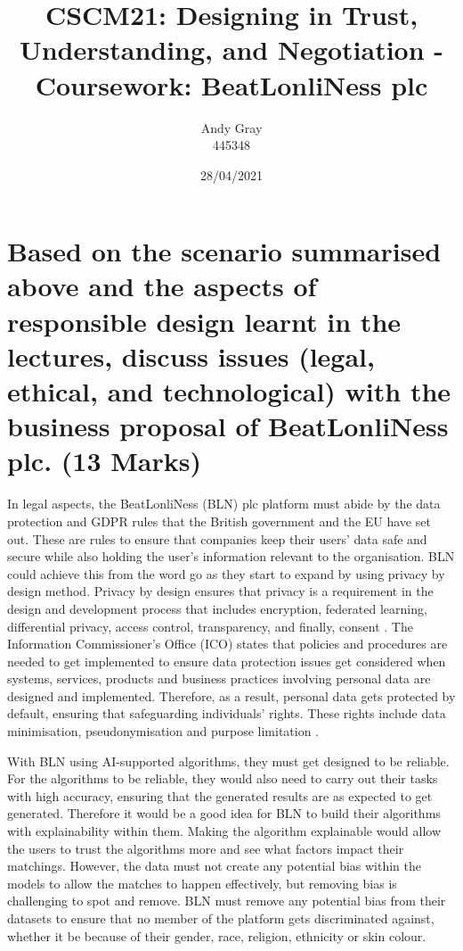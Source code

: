 \documentclass[a4paper,10pt]{article}
\begin{document}
\title{CSCM21: Designing in Trust, Understanding, and Negotiation - Coursework: BeatLonliNess plc}
\author{Andy Gray\\445348}
\date{28/04/2021}

\maketitle

\section{Based on the scenario summarised above and the aspects of responsible design learnt in the lectures, discuss issues (legal, ethical, and technological) with the business proposal of BeatLonliNess plc. (13 Marks)}
\label{sec:intro}

In legal aspects, the BeatLonliNess (BLN) plc platform must abide by the data protection and GDPR rules that the British government and the EU have set out. These are rules to ensure that companies keep their users' data safe and secure while also holding the user's information relevant to the organisation. BLN could achieve this from the word go as they start to expand by using privacy by design method. Privacy by design ensures that privacy is a requirement in the design and development process that includes encryption, federated learning, differential privacy, access control, transparency, and finally, consent \cite{berte_slides_ai_law_overview}. The Information Commissioner's Office (ICO) states that policies and procedures are needed to get implemented to ensure data protection issues get considered when systems, services, products and business practices involving personal data are designed and implemented. Therefore, as a result, personal data gets protected by default, ensuring that safeguarding individuals' rights. These rights include data minimisation, pseudonymisation and purpose limitation \cite{ico_website}. 

With BLN using AI-supported algorithms, they must get designed to be reliable. For the algorithms to be reliable, they would also need to carry out their tasks with high accuracy, ensuring that the generated results are as expected to get generated. Therefore it would be a good idea for BLN to build their algorithms with explainability within them. Making the algorithm explainable would allow the users to trust the algorithms more and see what factors impact their matchings. However, the data must not create any potential bias within the models to allow the matches to happen effectively, but removing bias is challenging to spot and remove. BLN must remove any potential bias from their datasets to ensure that no member of the platform gets discriminated against, whether it be because of their gender, race, religion, ethnicity or skin colour. 
\end{document}
